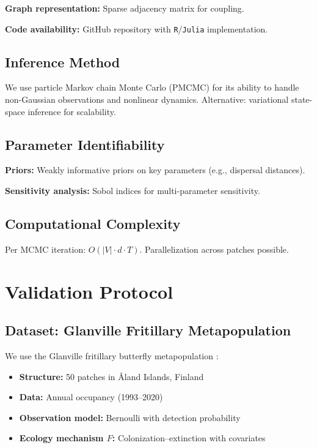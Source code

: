 \documentclass[12pt]{article}
\begin{document}
\textbf{Graph representation:} Sparse adjacency matrix for coupling.

\textbf{Code availability:} GitHub repository with \texttt{R}/\texttt{Julia} implementation.

\subsection{Inference Method}
\label{subsec:inference}

We use particle Markov chain Monte Carlo (PMCMC) \citep{Andrieu2010} for its ability to handle non-Gaussian observations and nonlinear dynamics. Alternative: variational state-space inference for scalability.

\subsection{Parameter Identifiability}
\label{subsec:identifiability}

\textbf{Priors:} Weakly informative priors on key parameters (e.g., dispersal distances).

\textbf{Sensitivity analysis:} Sobol indices for multi-parameter sensitivity.

\subsection{Computational Complexity}
\label{subsec:complexity}

Per MCMC iteration: $O(|V|\cdot d\cdot T)$. Parallelization across patches possible.

\section{Validation Protocol}
\label{sec:validation}

\subsection{Dataset: Glanville Fritillary Metapopulation}
\label{subsec:dataset}

We use the Glanville fritillary butterfly metapopulation \citep{Hanski2011}:
\begin{itemize}
    \item \textbf{Structure:} 50 patches in Åland Islands, Finland
    \item \textbf{Data:} Annual occupancy (1993–2020)
    \item \textbf{Observation model:} Bernoulli with detection probability
    \item \textbf{Ecology mechanism $F$:} Colonization–extinction with covariates
\end{itemize}
\end{document}
